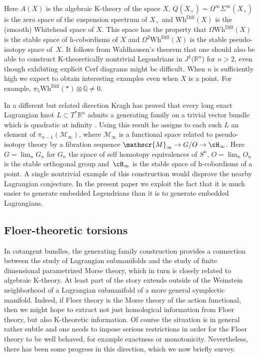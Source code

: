 \documentclass[JEP,XML,SOM,Unicode,NoFloatCountersInSection]{cedram}
\let\mathcal\mathscr
\newcommand{\Diff}{\mathrm{Diff}}
\newcommand{\Wh}{\mathrm{Wh}}
\theoremstyle{plain}
\theoremstyle{definition}
\newcommand{\cM}{\mathcal{M}}\newcommand{\cN}{\mathcal{N}}
\newcommand{\bQ}{\mathbb{Q}}\newcommand{\bR}{\mathbb{R}}
\begin{document}
Here $A(X)$ is the algebraic K-theory of the space $X$, $Q(X_+)=\Omega^\infty \Sigma^\infty (X_+)$ is the zero space of the suspension spectrum of $X_+$ and $\Wh^{\Diff}(X)$ is the (smooth) Whitehead space of $X$. This space has the property that $\Omega \Wh^{\Diff}(X)$ is the stable space of h-cobordisms of $X$ and $\Omega^2\Wh^{\Diff}(X)$ is the stable pseudo-isotopy space of~$X$. It follows from Waldhausen's theorem that one should also be able to construct K\nobreakdash-theoretically nontrivial Legendrians in $J^1(\bR^n$) for $n>2$, even though exhibiting explicit Cerf diagrams might be difficult. When $n$ is sufficiently high we expect to obtain interesting examples even when $X$ is a point. For example, $\pi_5 \Wh^{\Diff }( \ast ) \otimes \bQ \neq 0$.

In a different but related direction Kragh has proved that every long exact Lagran\-gian knot $L \subset T^*\bR^n$ admits a generating family on a trivial vector bundle which is quadratic at infinity \cite{K18}. Using this result he assigns to each such $L$ an element of $\pi_{n-1}(\cM_\infty)$, where $\cM_\infty$ is a functional space related to pseudo-isotopy theory by a fibration sequence $\cM_\infty \to G/O \to \cH_\infty$. Here $G=\lim_n G_n$ for $G_n$ the space of self homotopy equivalences of $S^n$, $O=\lim_nO_n$ is the stable orthogonal group and~$\cH_\infty$ is the stable space of h-cobordisms of a point. A single nontrivial example of this construction would disprove the nearby Lagrangian conjecture. In the present paper we exploit the fact that it is much easier to generate embedded Legendrians than it is to generate embedded Lagrangians.

\subsection{Floer-theoretic torsions}
In cotangent bundles, the generating family construction provides a connection between the study of Lagrangian submanifolds and the study of finite dimensional parametrized Morse theory, which in turn is closely related to algebraic K-theory. At least part of the story extends outside of the Weinstein neighborhood of a Lagrangian submanifold of a more general symplectic manifold. \hbox{Indeed}, if Floer theory is the Morse theory of the action functional, then we might hope to extract not just homological information from Floer theory, but also K-theoretic information. Of course the situation is in general rather subtle and one needs to impose serious restrictions in order for the Floer theory to be well behaved, for example exactness or monotonicity. Nevertheless, there has been some progress in this direction, which we now briefly survey.
\end{document}
